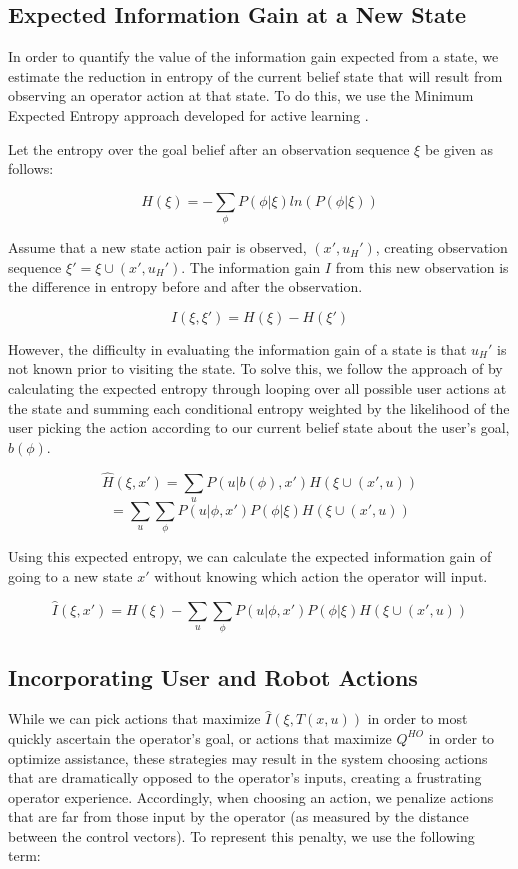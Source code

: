 \documentclass[conference]{IEEEtran}
\begin{document}
\subsection{Expected Information Gain at a New State}

In order to quantify the value of the information gain expected from a state, we estimate the reduction in entropy of the current belief state that will result from observing an operator action at that state. To do this, we use the Minimum Expected Entropy approach developed for active learning \cite{holub2008entropy}.

Let the entropy over the goal belief after an observation sequence $\xi$ be given as follows:

\[
H(\xi) = -\sum_\phi P(\phi|\xi)ln(P(\phi|\xi))
\]

Assume that a new state action pair is observed, $(x',u_H')$, creating observation sequence $\xi' = \xi \cup (x', u_H')$. The information gain $I$ from this new observation is the difference in entropy before and after the observation.

\[
I(\xi, \xi') = H(\xi) - H(\xi')
\]

However, the difficulty in evaluating the information gain of a state is that $u_H'$ is not known prior to visiting the state. To solve this, we follow the approach of \citet{holub2008entropy} by calculating the expected entropy through looping over all possible user actions at the state and summing each conditional entropy weighted by the likelihood of the user picking the action according to our current belief state about the user's goal, $b(\phi)$.

\[
\hat{H}(\xi, x') = \sum_u P(u|b(\phi),x')H(\xi \cup (x', u))
\]
\[
= \sum_u \sum_\phi P(u|\phi,x')P(\phi|\xi)H(\xi \cup (x', u))
\]

Using this expected entropy, we can calculate the expected information gain of going to a new state $x'$ without knowing which action the operator will input.

\[
\hat{I}(\xi, x') = H(\xi) - \sum_u \sum_\phi P(u|\phi,x')P(\phi|\xi)H(\xi \cup (x', u))
\]

\subsection{Incorporating User and Robot Actions}
While we can pick actions that maximize $\hat{I}(\xi, T(x,u))$ in order to most quickly ascertain the operator's goal, or actions that maximize $Q^{HO}$ in order to optimize assistance, these strategies may result in the system choosing actions that are dramatically opposed to the operator's inputs, creating a frustrating operator experience. Accordingly, when choosing an action, we penalize actions that are far from those input by the operator (as measured by the distance between the control vectors). To represent this penalty, we use the following term:
\end{document}

